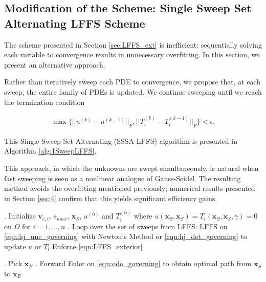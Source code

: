 \documentclass[pdflatex,sn-mathphys-num]{sn-jnl}%
\def \bx{{\mathbf {x}}}
\def \bv{{\mathbf {v}}}
\theoremstyle{thmstyleone}%
\theoremstyle{thmstyletwo}%
\theoremstyle{thmstylethree}%
\begin{document}
\subsection{Modification of the Scheme: Single Sweep Set Alternating LFFS Scheme}


\label{sec:LFFS_mod}
The scheme presented in Section \ref{sec:LFFS_ext} is inefficient: sequentially solving each variable to convergence results in unnecessary overfitting.  In this section, we present an alternative approach.  

Rather than iteratively sweep each PDE to convergence, we propose that, at each sweep, the entire family of PDEs is updated.  We continue sweeping until we reach the termination condition


\begin{align*}
\max \{||u^{(k)}-u^{(k-1)}||_F,{||T_{i}^{(k)}-T_{i}^{(k-1)}||_F} \}<\epsilon.
\end{align*}

This Single Sweep Set Alternating (SSSA-LFFS) algorithm is presented in Algorithm \ref{alg:1SweepLFFS}.

This approach, in which the unknowns are swept simultaneously, is natural when fast sweeping is seen as a nonlinear analogue of Gauss-Seidel.  The resulting method avoids the overfitting mentioned previously; numerical results presented in Section \ref{sec:4} confirm that this yields significant efficiency gains.  


\begin{algorithm} [!h]
\scriptsize
\caption{Path Planning with Uncertainty - Single Sweep Set Alternating LFFS Scheme (SSSA-LFFS)}\label{alg:1SweepLFFS}
\begin{algorithmic}
. Initialize ${\bv_{c,i}}$, $s_{max}$, $\bx_S$, $u^{(0)}$ and ${T_i^{(0)}}$ where ${u(\bx_S,\bx_S)=T_i(\bx_S,\bx_S,\gamma)=0}$ on $\Omega$ for $i=1,...,n$
. Loop over the set of sweeps from LFFS: 
\State LFFS on {\eqref{eqn:hj_unc_governing} with Newton's Method or \eqref{eqn:hj_det_governing} to update $u$ or $T_i$}
\State Enforce \eqref{eqn:LFFS_exterior}
\EndFor
\EndFor

\EndWhile
{}. Pick $\bx_E$
. Forward Euler on \eqref{eqn:ode_governing} to obtain optimal path from $\bx_S$ to $\bx_E$
\end{algorithmic}
\end{algorithm}
\end{document}
